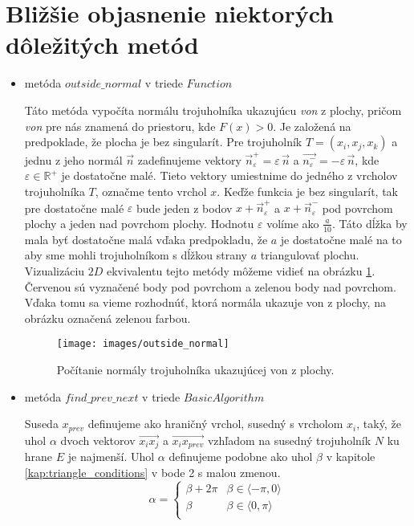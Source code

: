 \section{Bližšie objasnenie niektorých dôležitých metód}
\label{kap:important_methods}
\begin{itemize}
\item{
    metóda $outside\_normal$ v triede $Function$
        
    Táto metóda vypočíta normálu trojuholníka ukazujúcu \textit{von} z plochy, 
    pričom \textit{von} pre nás znamená do priestoru, kde $F(x)>0$.
    Je založená na predpoklade, že plocha je bez singularít. Pre trojuholník
    $T = (x_i, x_j, x_k)$ a jednu z jeho normál $\overrightarrow{n}$
    zadefinujeme vektory $\overrightarrow{n}_{\varepsilon}^+ = \varepsilon \, \overrightarrow{n}$
    a $\overrightarrow{n_{\varepsilon}^-} = - \varepsilon \, \overrightarrow{n}$, kde
    $\varepsilon \in \mathbb{R}^+$ je dostatočne malé.
    Tieto vektory umiestnime do jedného z vrcholov trojuholníka $T$, označme tento vrchol $x$.
    Keďže funkcia je bez singularít, tak pre dostatočne malé $\varepsilon$ bude jeden z
    bodov $x + \overrightarrow{n}_{\varepsilon}^+$ a $x + \overrightarrow{n}_{\varepsilon}^-$ 
    pod povrchom plochy a jeden nad povrchom plochy. 
    Hodnotu $\varepsilon$ volíme ako $\frac{a}{10}$. Táto dĺžka by mala byť dostatočne malá vďaka predpokladu, 
    že $a$ je dostatočne 
    malé na to aby sme mohli trojuholníkom s dĺžkou strany $a$ triangulovať plochu.
    Vizualizáciu $2D$ ekvivalentu tejto metódy môžeme vidieť na obrázku \ref{obr:outside_normal}.
    Červenou sú vyznačené body pod povrchom a zelenou body nad povrchom. Vďaka tomu sa vieme 
    rozhodnúť, ktorá normála ukazuje von z plochy, na obrázku označená zelenou farbou.

    \begin{figure}
        \centerline{\texttt{[image: images/outside\_normal]}}
        \caption[Počítanie normály trojuholníka ukazujúcej von z plochy]
        {Počítanie normály trojuholníka ukazujúcej von z plochy.}
        \label{obr:outside_normal}
    \end{figure}
}

\item{
    metóda $find\_prev\_next$ v triede $BasicAlgorithm$

    Suseda $x_{prev}$ definujeme ako 
    hraničný vrchol, susedný s vrcholom $x_i$, taký, že uhol $\alpha$ dvoch vektorov
    $\overrightarrow{x_i x_j}$ a $\overrightarrow{x_i x_{prev}}$ vzhľadom 
    na susedný trojuholník $N$ ku hrane $E$ je najmenší. Uhol $\alpha$ definujeme podobne
    ako uhol $\beta$ v kapitole \ref{kap:triangle_conditions} v bode 2 s malou zmenou. 
    \[ 
    \alpha = \left\{
    \begin{array}{ll}
        \beta + 2 \pi & \beta \in \langle -\pi, 0 \rangle\\
        \beta & \beta \in \langle 0, \pi \rangle\\
    \end{array} 
    \right. 
    \]
    
}
\end{itemize}
